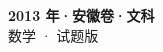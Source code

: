 \documentclass[zihao=-4, a4paper]{ctexart}
\begin{document}
\begin{center}
  {\Large\bfseries 2013 年·安徽卷·文科}\\[4pt]
  {\large 数学 · 试题版}
\end{center}
\medskip
{}

\end{document}
